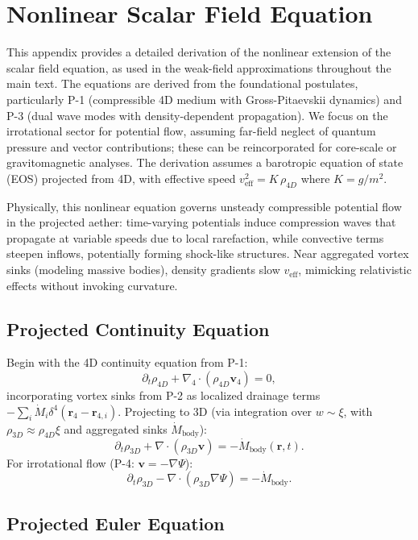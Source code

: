 \appendix
\section{Nonlinear Scalar Field Equation}

This appendix provides a detailed derivation of the nonlinear extension of the scalar field equation, as used in the weak-field approximations throughout the main text. The equations are derived from the foundational postulates, particularly P-1 (compressible 4D medium with Gross-Pitaevskii dynamics) and P-3 (dual wave modes with density-dependent propagation). We focus on the irrotational sector for potential flow, assuming far-field neglect of quantum pressure and vector contributions; these can be reincorporated for core-scale or gravitomagnetic analyses. The derivation assumes a barotropic equation of state (EOS) projected from 4D, with effective speed $v_{\text{eff}}^2 = K \, \rho_{4D}$ where $K = g/m^{2}$.

Physically, this nonlinear equation governs unsteady compressible potential flow in the projected aether: time-varying potentials induce compression waves that propagate at variable speeds due to local rarefaction, while convective terms steepen inflows, potentially forming shock-like structures. Near aggregated vortex sinks (modeling massive bodies), density gradients slow $v_{\text{eff}}$, mimicking relativistic effects without invoking curvature.

\subsection{Projected Continuity Equation}

Begin with the 4D continuity equation from P-1:
\[
\partial_t \rho_{4D} + \nabla_4 \cdot (\rho_{4D} \mathbf{v}_4) = 0,
\]
incorporating vortex sinks from P-2 as localized drainage terms $-\sum_i \dot{M}_i \delta^4(\mathbf{r}_4 - \mathbf{r}_{4,i})$. Projecting to 3D (via integration over $w \sim \xi$, with $\rho_{3D} \approx \rho_{4D} \xi$ and aggregated sinks $\dot{M}_{\text{body}}$):
\[
\partial_t \rho_{3D} + \nabla \cdot (\rho_{3D} \mathbf{v}) = -\dot{M}_{\text{body}}(\mathbf{r}, t).
\]
For irrotational flow (P-4: $\mathbf{v} = -\nabla \Psi$):
\[
\partial_t \rho_{3D} - \nabla \cdot (\rho_{3D} \nabla \Psi) = -\dot{M}_{\text{body}}.
\]

\subsection{Projected Euler Equation}

